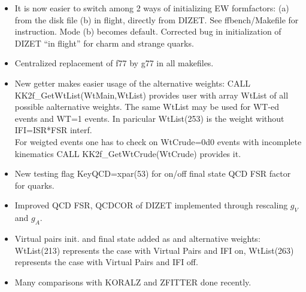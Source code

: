 \documentclass[dvips,portrait]{seminar}             %
\begin{document}
\def\title{\Color{PineGreen} News from KKMC development}
\begin{slide*}                                                %



{\small\color{blue} 
\begin{itemize}
\item
   It is now easier to switch among 2 ways of initializing EW formfactors:
           (a) from the disk file 
           (b) in flight, directly from DIZET.
   See ffbench/Makefile for instruction. Mode (b) becomes default.
   {\scriptsize Corrected bug in initialization of DIZET ``in flight'' for charm and strange quarks}.
\item
   {\scriptsize Centralized replacement of f77 by g77 in all makefiles.}
\item
   New getter makes easier usage of the { alternative weights}:
          CALL  KK2f\_GetWtList(WtMain,WtList)
   provides user with array WtList of all possible aalternative weights.
   The same WtList may be used for WT-ed events and WT=1 events.
   In paricular  WtList(253) is { the weight without IFI=ISR*FSR interf}.\\
   {\scriptsize For weigted events one has to check on WtCrude=0d0 events with incomplete kinematics
          CALL  KK2f\_GetWtCrude(WtCrude) provides it.}
\item
   {\scriptsize New testing flag KeyQCD=xpar(53) for on/off final state QCD FSR factor for quarks.}
\item
   Improved QCD FSR, QCDCOR of DIZET implemented through rescaling $g_V$ and $g_A$.
\item 
   Virtual pairs init. and final state added as and { alternative weights}:
          WtList(213) represents the case with { Virtual Pairs and IFI on},
          WtList(263) represents the case with { Virtual Pairs and IFI off}.
\item
   { Many comparisons with KORALZ and ZFITTER done recently}.
\end{itemize}}


\vfill
\end{slide*}   %
\end{document}
